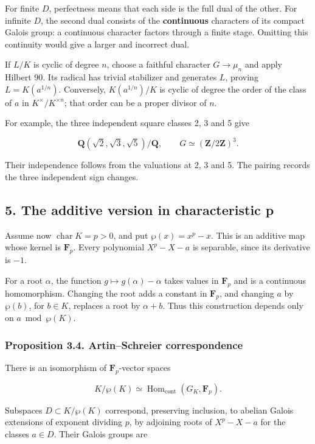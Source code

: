 \documentclass[11pt,a4paper]{article}
\begin{document}
For finite \(D\), perfectness means that each side is the full dual of
the other. For infinite \(D\), the second dual consists of the
\textbf{continuous} characters of its compact Galois group: a continuous
character factors through a finite stage. Omitting this continuity would
give a larger and incorrect dual.

If \(L/K\) is cyclic of degree \(n\), choose a faithful character
\(G\to\mu_n\) and apply Hilbert 90. Its radical has trivial stabilizer
and generates \(L\), proving \(L=K(a^{1/n})\). Conversely,
\(K(a^{1/n})/K\) is cyclic of degree the order of the class of \(a\) in
\(K^\times/K^{\times n}\); that order can be a proper divisor of \(n\).

For example, the three independent square classes 2, 3 and 5 give

\[
\mathbf Q(\sqrt2,\sqrt3,\sqrt5)/\mathbf Q,
\qquad G\simeq(\mathbf Z/2\mathbf Z)^3.
\]

Their independence follows from the valuations at 2, 3 and 5. The
pairing records the three independent sign changes.

\subsection{5. The additive version in characteristic
p}\label{the-additive-version-in-characteristic-p}

Assume now \(\operatorname{char}K=p>0\), and put \(\wp(x)=x^p-x\). This
is an additive map whose kernel is \(\mathbf F_p\). Every polynomial
\(X^p-X-a\) is separable, since its derivative is \(-1\).

For a root \(\alpha\), the function \(g\mapsto g(\alpha)-\alpha\) takes
values in \(\mathbf F_p\) and is a continuous homomorphism. Changing the
root adds a constant in \(\mathbf F_p\), and changing \(a\) by
\(\wp(b)\), for \(b\in K\), replaces a root by \(\alpha+b\). Thus this
construction depends only on \(a\bmod\wp(K)\).

\subsubsection{Proposition 3.4. Artin--Schreier
correspondence}\label{proposition-3.4.-artinschreier-correspondence}

There is an isomorphism of \(\mathbf F_p\)-vector spaces

\[
K/\wp(K)\simeq\operatorname{Hom}_{\mathrm{cont}}(G_K,\mathbf F_p).
\]

Subspaces \(D\subset K/\wp(K)\) correspond, preserving inclusion, to
abelian Galois extensions of exponent dividing \(p\), by adjoining roots
of \(X^p-X-a\) for the classes \(a\in D\). Their Galois groups are
\end{document}
